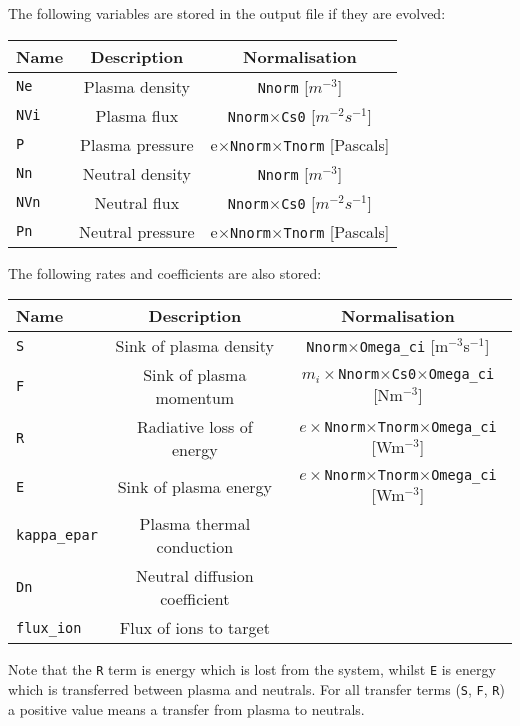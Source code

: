 \documentclass[12pt,a4paper]{article}
\begin{document}
\noindent The following variables are stored in the output file if they are evolved:

\begin{center}
\begin{tabular}{l c c}
  Name & Description & Normalisation \\
  \hline
  \texttt{Ne}  & Plasma density  & \texttt{Nnorm} [$m^{-3}$]\\
  \texttt{NVi} & Plasma flux  & \texttt{Nnorm}$\times$\texttt{Cs0} [$m^{-2}s^{-1}$]\\
  \texttt{P}   & Plasma pressure & e$\times$\texttt{Nnorm}$\times$\texttt{Tnorm} [Pascals] \\
  \texttt{Nn}  & Neutral density & \texttt{Nnorm} [$m^{-3}$] \\
  \texttt{NVn} & Neutral flux  & \texttt{Nnorm}$\times$\texttt{Cs0} [$m^{-2}s^{-1}$]\\
  \texttt{Pn}  & Neutral pressure & e$\times$\texttt{Nnorm}$\times$\texttt{Tnorm} [Pascals] \\
  \hline
\end{tabular}
\end{center}

\noindent The following rates and coefficients are also stored:
\begin{center}
\begin{tabular}{l c c}
  Name & Description & Normalisation \\
  \hline
  \texttt{S} & Sink of plasma density & \texttt{Nnorm}$\times$\texttt{Omega\_ci} [m$^{-3}$s$^{-1}$] \\
  \texttt{F} & Sink of plasma momentum & $m_i\times$\texttt{Nnorm}$\times$\texttt{Cs0}$\times$\texttt{Omega\_ci} [Nm$^{-3}$] \\
  \texttt{R} & Radiative loss of energy & $e\times$\texttt{Nnorm}$\times$\texttt{Tnorm}$\times$\texttt{Omega\_ci} [Wm$^{-3}$] \\
  \texttt{E} & Sink of plasma energy & $e\times$\texttt{Nnorm}$\times$\texttt{Tnorm}$\times$\texttt{Omega\_ci} [Wm$^{-3}$] \\
  \texttt{kappa\_epar} & Plasma thermal conduction & \\
  \texttt{Dn} & Neutral diffusion coefficient & \\
  \texttt{flux\_ion} & Flux of ions to target &  \\
  \hline
\end{tabular}
\end{center}
Note that the \texttt{R} term is energy which is lost from the system, whilst \texttt{E} is energy which is
transferred between plasma and neutrals. For all transfer terms (\texttt{S}, \texttt{F}, \texttt{R}) a positive value means
a transfer from plasma to neutrals.
\end{document}
